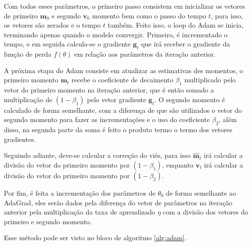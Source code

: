 Com todos esses parâmetros, o primeiro passo consistem em inicializar os vetores de primeiro $\mathbf{m}_0$ e segundo $\mathbf{v}_0$ momento bem como o passo do tempo $t$, para isso, os vetores são zerados e o tempo $t$ também. Feito isso, o loop do Adam se inicia, terminando apenas quando o modelo convergir. Primeiro, é incrementado o tempo, e em seguida calcula-se o gradiente $\mathbf{g}_t$ que irá receber o gradiente da função de perda $f(\theta)$ em relação aos parâmetros da iteração anterior.

A próxima etapa do Adam consiste em atualizar as estimativas des momentos, o primeiro momento $\mathbf{m}_t$ recebe o coeficiente de decaimento $\beta_1$ multiplicado pelo vetor do primeiro momento na iteração anterior, que é então somado a multiplicação de $(1 - \beta_1)$ pelo vetor gradiente $\mathbf{g}_t$. O segundo momento é calculado de forma semelhante, com a diferença de que são utilizados o vetor do segundo momento para fazer as incrementações e o uso do coeficiente $\beta_2$, além disso, na segunda parte da soma é feito o produto termo o termo dos vetores gradientes.

Seguindo adiante, deve-se calcular a correção do viés, para isso $\mathbf{\hat{m}}_t$ irá calcular a divisão do vetor do primeiro momento por $(1 - \beta_1)$, enquanto $\mathbf{\hat{v}}_t$ irá calcular a divisão do vetor do primeiro momento por $(1 - \beta_2)$.

Por fim, é feita a incrementação dos parâmetros de $\theta_0$ de forma semelhante ao AdaGrad, eles serão dados pela diferença do vetor de parâmetros na iteração anterior pela multiplicação da taxa de aprendizado $\eta$ com a divisão dos vetores do primeiro e segundo momento.

Esse método pode ser visto no bloco de algoritmo \ref{alg:adam}.

